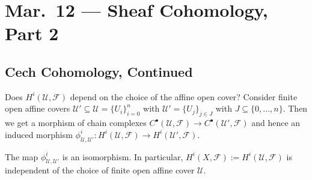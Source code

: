 \chapter{Mar.~12 --- Sheaf Cohomology, Part 2}

\section{Cech Cohomology, Continued}

\begin{remark}
  Does $H^i(\mathcal{U}, \mathcal{F})$
  depend on the choice of the affine
  open cover? Consider finite open affine
  covers $\mathcal{U}' \subseteq \mathcal{U} = \{U_i\}_{i = 0}^n$
  with $\mathcal{U}' = \{U_j\}_{j \in J}$
  with $J \subseteq \{0, \dots, n\}$.
  Then we get a morphism of chain complexes
  $C^\bullet(\mathcal{U}, \mathcal{F}) \to C^\bullet(\mathcal{U}', \mathcal{F})$
  and hence an induced morphism
  $\phi_{\mathcal{U}, \mathcal{U}'}^i : H^i(\mathcal{U}, \mathcal{F}) \to H^i(\mathcal{U}', \mathcal{F})$.
\end{remark}

\begin{theorem}\label{thm:cech-cohomology-independence}
  The map $\phi^i_{\mathcal{U}, \mathcal{U}'}$
  is an isomorphism. In particular,
  $H^i(X, \mathcal{F}) := H^i(\mathcal{U}, \mathcal{F})$
  is independent of the choice of finite
  open affine cover $\mathcal{U}$.
\end{theorem}

